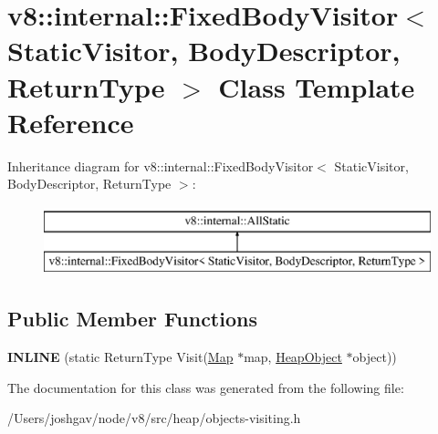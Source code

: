 \hypertarget{classv8_1_1internal_1_1_fixed_body_visitor}{}\section{v8\+:\+:internal\+:\+:Fixed\+Body\+Visitor$<$ Static\+Visitor, Body\+Descriptor, Return\+Type $>$ Class Template Reference}
\label{classv8_1_1internal_1_1_fixed_body_visitor}
Inheritance diagram for v8\+:\+:internal\+:\+:Fixed\+Body\+Visitor$<$ Static\+Visitor, Body\+Descriptor, Return\+Type $>$\+:\begin{figure}[H]
\begin{center}
\leavevmode
\includegraphics[height=2.000000cm]{classv8_1_1internal_1_1_fixed_body_visitor}
\end{center}
\end{figure}
\subsection*{Public Member Functions}
\begin{DoxyCompactItemize}
\item 
{\bfseries I\+N\+L\+I\+NE} (static Return\+Type Visit(\hyperlink{classv8_1_1internal_1_1_map}{Map} $\ast$map, \hyperlink{classv8_1_1internal_1_1_heap_object}{Heap\+Object} $\ast$object))\hypertarget{classv8_1_1internal_1_1_fixed_body_visitor_ad6b3f7172b5cf70540c513c3085ae8bc}{}\label{classv8_1_1internal_1_1_fixed_body_visitor_ad6b3f7172b5cf70540c513c3085ae8bc}

\end{DoxyCompactItemize}


The documentation for this class was generated from the following file\+:\begin{DoxyCompactItemize}
\item 
/\+Users/joshgav/node/v8/src/heap/objects-\/visiting.\+h\end{DoxyCompactItemize}
